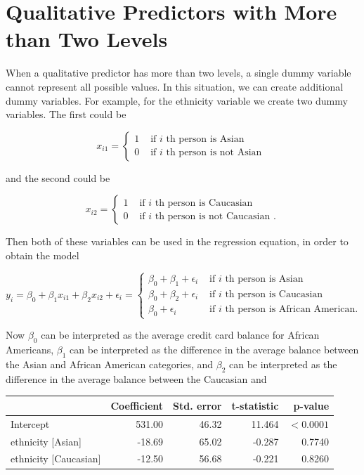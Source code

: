 \documentclass[10pt]{article}
\begin{document}
\section*{Qualitative Predictors with More than Two Levels}
When a qualitative predictor has more than two levels, a single dummy variable cannot represent all possible values. In this situation, we can create additional dummy variables. For example, for the ethnicity variable we create two dummy variables. The first could be

\[
x_{i 1}= \begin{cases}1 & \text { if } i \text { th person is Asian }  \tag{3.28}\\ 0 & \text { if } i \text { th person is not Asian }\end{cases}
\]

and the second could be

\[
x_{i 2}= \begin{cases}1 & \text { if } i \text { th person is Caucasian }  \tag{3.29}\\ 0 & \text { if } i \text { th person is not Caucasian } .\end{cases}
\]

Then both of these variables can be used in the regression equation, in order to obtain the model

\[
y_{i}=\beta_{0}+\beta_{1} x_{i 1}+\beta_{2} x_{i 2}+\epsilon_{i}= \begin{cases}\beta_{0}+\beta_{1}+\epsilon_{i} & \text { if } i \text { th person is Asian }  \tag{3.30}\\ \beta_{0}+\beta_{2}+\epsilon_{i} & \text { if } i \text { th person is Caucasian } \\ \beta_{0}+\epsilon_{i} & \text { if } i \text { th person is African American. }\end{cases}
\]

Now $\beta_{0}$ can be interpreted as the average credit card balance for African Americans, $\beta_{1}$ can be interpreted as the difference in the average balance between the Asian and African American categories, and $\beta_{2}$ can be interpreted as the difference in the average balance between the Caucasian and

\begin{center}
\begin{tabular}{l|rrrr}
\hline
 & Coefficient & Std. error & t-statistic & p-value \\
\hline
Intercept & 531.00 & 46.32 & 11.464 & $<0.0001$ \\
ethnicity [Asian] & -18.69 & 65.02 & -0.287 & 0.7740 \\
ethnicity [Caucasian] & -12.50 & 56.68 & -0.221 & 0.8260 \\
\hline
\end{tabular}
\end{center}
\end{document}
